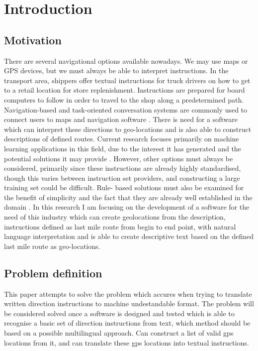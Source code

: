\section{Introduction}


\subsection{Motivation}

There are several navigational options available nowadays. We may use maps or GPS devices, but we must always be able to interpret instructions. In the transport area, shippers offer textual instructions for truck drivers on how to get to a retail location for store replenishment. Instructions are prepared for board computers to follow in order to travel to the shop along a predetermined path. Navigation-based and task-oriented conversation systems are commonly used to connect users to maps and navigation software \cite{williams2017hybrid}. There is need for a software which can interpret these directions to geo-locations and is also able to construct descriptions of defined routes. Current research focuses primarily on machine learning applications in this field, due to the interest it has generated and the potential solutions it may provide \cite{hashimoto2016joint}. However, other options must always be considered, primarily since these instructions are already highly standardised, though this varies between instruction set providers, and constructing a large training set could be difficult. Rule- based solutions must also be examined for the benefit of simplicity and the fact that they are already well established in the domain \cite{xu2021ontology}. In this research I am focusing on the development of a software for the need of this industry which can create geolocations from the description, instructions defined as last mile route from begin to end point, with natural language interpretation and is able to create descriptive text based on the defined last mile route as geo-locations.

\subsection{Problem definition }

This paper attempts to solve the problem which accures when trying to translate written direction instructions to machine undestandable format. The problem will be considered solved once a software is designed and tested which is able to recognise a basic set of direction instructions from text, which method should be based on a possible multilingual approach. Can construct a list of valid gps locations from it, and can translate these gps locations into textual instructions.  

